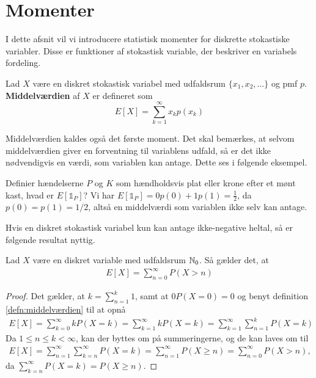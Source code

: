 \section{Momenter}
I dette afsnit vil vi introducere statistisk momenter for diskrette stokastiske variabler. Disse er funktioner af stokastisk variable, der beskriver en variabels fordeling. 

\begin{defn}\label{defn:middelværdien} %
    Lad $X$ være en diskret stokastisk variabel med udfaldsrum $\{x_1, x_2, \ldots\}$ og pmf $p$. \textbf{Middelværdien} af $X$ er defineret som
    \begin{equation*}
        E[X] = \sum^\infty_{k = 1} x_k p(x_k)
    \end{equation*}
\end{defn}
Middelværdien kaldes også det første moment.  Det skal bemærkes, at selvom middelværdien giver en forventning til variablens udfald, så er det ikke nødvendigvis en værdi, som variablen kan antage. Dette ses i følgende eksempel.

\begin{exmp}
    Definier hændelserne $P$ og $K$ som hændholdsvis plat eller krone efter et mønt kast, hvad er $E[\mathbb{1}_{P}]$? Vi har $E[\mathbb{1}_{P}] = 0p(0) + 1p(1) = \frac{1}{2}$, da $p(0) = p(1) = 1/2$, altså en middelværdi som variablen ikke selv kan antage.
\end{exmp}

Hvis en diskret stokastisk variabel kun kan antage ikke-negative heltal, så er følgende resultat nyttig.

\begin{prop} \label{prop:2.9}%
Lad $X$ være en diskret variable med udfaldsrum $\mathbb{N}_0$. Så gælder det, at
\begin{align*}
    E[X] = \sum^\infty_{n = 0} P(X > n)
\end{align*}
\end{prop}
\begin{proof}
    Det gælder, at $k = \sum^k_{n = 1} 1$, samt at $0P(X=0)=0$ og benyt definition \ref{defn:middelværdien} til at opnå
    \begin{align*}
        E[X] = \sum^\infty_{k = 0} k P(X = k)
        = \sum^\infty_{k = 1} k P(X = k)
        = \sum^\infty_{k = 1} \sum^k_{n = 1} P(X = k) 
\end{align*}
        Da $1\leq n \leq k < \infty$, kan der byttes om på summeringerne, og de kan laves om til
\begin{align*}
    E[X] = \sum^\infty_{n = 1} \sum^\infty_{k = n} P(X = k) = \sum^\infty_{n = 1} P(X \geq n) = \sum^\infty_{n = 0} P(X > n),
    \end{align*}
    da $\sum^\infty_{k = n} P(X = k) = P(X \geq n)$. 
\end{proof}

